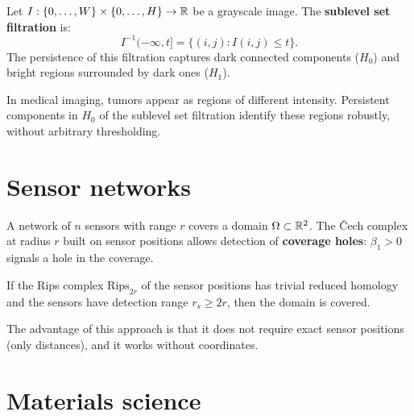 \begin{definition}
Let $I : \{0, \ldots, W\} \times \{0, \ldots, H\} \to \mathbb{R}$ be a
grayscale image. The \textbf{sublevel set filtration} is:
\[
  I^{-1}(-\infty, t] = \{(i,j) : I(i,j) \leq t\}.
\]
The persistence of this filtration captures dark connected
components ($H_0$) and bright regions surrounded by dark
ones ($H_1$).
\end{definition}

\begin{example}
In medical imaging, tumors appear as regions of different intensity.
Persistent components in $H_0$ of the sublevel set filtration
identify these regions robustly, without arbitrary thresholding.
\end{example}

\section{Sensor networks}
\label{sec:sensors}

\begin{definition}
A network of $n$ sensors with range $r$ covers a domain
$\Omega \subset \mathbb{R}^2$. The \v{C}ech complex at radius $r$
built on sensor positions allows detection of \textbf{coverage
holes}: $\beta_1 > 0$ signals a hole in the coverage.
\end{definition}

\begin{theorem}
If the Rips complex $\mathrm{Rips}_{2r}$ of the sensor positions
has trivial reduced homology and the sensors have detection range
$r_s \geq 2r$, then the domain is covered.
\end{theorem}

\begin{remark}
The advantage of this approach is that it does not require exact
sensor positions (only distances), and it works without coordinates.
\end{remark}

\section{Materials science}
\label{sec:materials}

